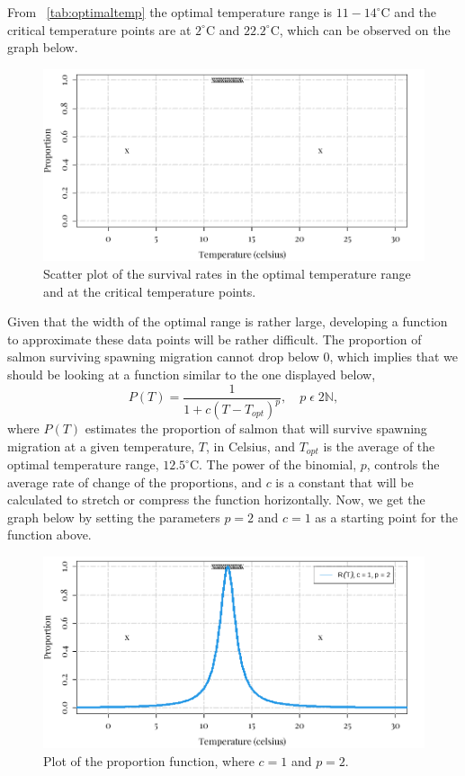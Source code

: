 From \tablename~\ref{tab:optimaltemp} the optimal temperature range is $11-14^{\circ}$C and the critical temperature points are at $2^{\circ}$C and $22.2^{\circ}$C, which can be observed on the graph below.
\begin{figure}[H]
    \centering
    \includegraphics[width=14cm]{Pictures/Salmon Pop/salmon repo model/proportion survival.png}
    \caption{\singlespacing
    Scatter plot of the survival rates in the optimal temperature range and at the critical temperature points.}
    \label{fig:reproductionpoints}
\end{figure}
Given that the width of the optimal range is rather large, developing a function to approximate these data points will be rather difficult.
The proportion of salmon surviving spawning migration cannot drop below 0, which implies that we should be looking at a function similar to the one displayed below,
\begin{equation}\label{eq:repogeneral}
    P(T) = \frac{1}{1+c(T-T_{opt})^p}, \quad p\; \epsilon\; 2\mathbb{N},
\end{equation}
where $P(T)$ estimates the proportion of salmon that will survive spawning migration at a given temperature, $T$, in Celsius, and $T_{opt}$ is the average of the optimal temperature range, $12.5^{\circ}$C. 
The power of the binomial, $p$, controls the average rate of change of the proportions, and $c$ is a constant that will be calculated to stretch or compress the function horizontally.
Now, we get the graph below by setting the parameters $p=2$ and $c=1$ as a starting point for the function above.
\begin{figure}[H]
    \centering
    \includegraphics[width=14cm]{Pictures/Salmon Pop/salmon repo model/Repo F2 c1.png}
    \caption{\singlespacing
    Plot of the proportion function, where $c=1$ and $p=2$.}
    \label{fig:reporductioncurve2c1}
\end{figure}
